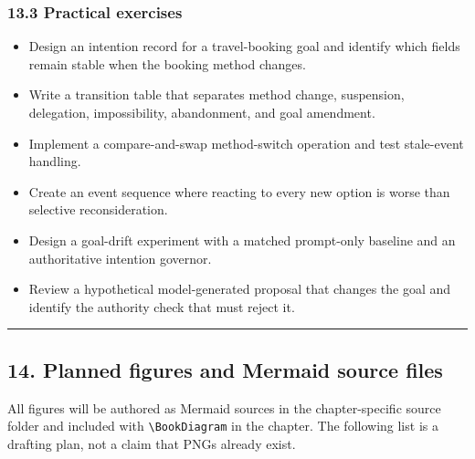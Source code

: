 \subsubsection{13.3 Practical exercises}\label{practical-exercises}

\begin{itemize}
\tightlist
\item
  Design an intention record for a travel-booking goal and identify which fields remain stable when the booking method changes.
\item
  Write a transition table that separates method change, suspension, delegation, impossibility, abandonment, and goal amendment.
\item
  Implement a compare-and-swap method-switch operation and test stale-event handling.
\item
  Create an event sequence where reacting to every new option is worse than selective reconsideration.
\item
  Design a goal-drift experiment with a matched prompt-only baseline and an authoritative intention governor.
\item
  Review a hypothetical model-generated proposal that changes the goal and identify the authority check that must reject it.
\end{itemize}

\begin{center}\rule{0.5\linewidth}{0.5pt}\end{center}

\subsection{14. Planned figures and Mermaid source files}\label{planned-figures-and-mermaid-source-files}

All figures will be authored as Mermaid sources in the chapter-specific source folder and included with \texttt{\textbackslash{}BookDiagram} in the chapter. The following list is a drafting plan, not a claim that PNGs already exist.

